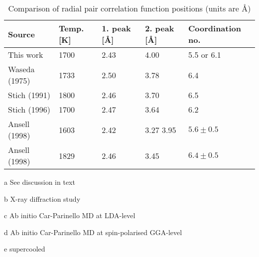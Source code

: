 \documentclass[11pt,bibliography=totoc,index=totoc]{scrbook}   %
\begin{document}
\begin{table}[htbp]
   \centering
   \begin{threeparttable}[htbp]
     \begin{tabular}{lllll}
        \toprule
          Source & Temp. [K] & 1. peak [Å] & 2. peak [Å] & Coordination no. \\
        \midrule
          This work 
          & 1700                  & 2.43 & 4.00       & 5.5 or 6.1\tnote{a}  \\
          Waseda (1975)\cite{Waseda:1975}\tnote{b}
            & 1733                  & 2.50 & 3.78       & 6.4   \\
          Stich (1991)\cite{Stich:1991}\tnote{c}    
            & 1800                  & 2.46 & 3.70       & 6.5   \\
          Stich (1996)\cite{Stich:1996}\tnote{d}    
            & 1700                  & 2.47 & 3.64       & 6.2   \\
          Ansell (1998)\cite{Ansell:1998}\tnote{b,e}
            & 1603                  & 2.42 & 3.27 3.95  & $5.6\pm 0.5$   \\
          Ansell (1998)\cite{Ansell:1998}\tnote{b}      
            & 1829                  & 2.46 & 3.45       & $6.4\pm 0.5$   \\
       \bottomrule
     \end{tabular}
     {\footnotesize
       \begin{tablenotes}
         \item[a] See discussion in text
         \item[b] X-ray diffraction study
         \item[c] Ab initio Car-Parinello MD at LDA-level
         \item[d] Ab initio Car-Parinello MD at spin-polarised GGA-level
         \item[e] supercooled
       \end{tablenotes}
     }
   \end{threeparttable}
   \caption{Comparison of radial pair correlation function positions (units are Å)}
   \label{tab:pcf}
\end{table}
\end{document}
